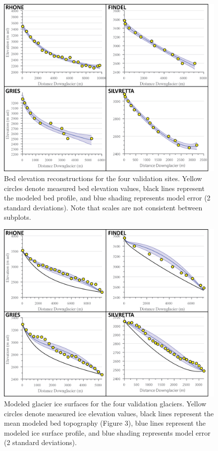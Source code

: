 \documentclass[review]{elsarticle}
\begin{document}
\begin{figure}
    \centering
    \includegraphics[width=\textwidth]{Figures/Hypsometry.png}
    \caption{Bed elevation reconstructions for the four validation sites. Yellow circles denote measured bed elevation values, black lines represent the modeled bed profile, and blue shading represents model error (2 standard deviations). Note that scales are not consistent between subplots.}
    \label{fig:hyp}
\end{figure}

\begin{figure}
    \centering
    \includegraphics[width=\textwidth]{Figures/Ice.png}
    \caption{Modeled glacier ice surfaces for the four validation glaciers. Yellow circles denote measured ice elevation values, black lines represent the mean modeled bed topography (Figure 3), blue lines represent the modeled ice surface profile, and blue shading represents model error (2 standard deviations).}
    \label{fig:ice}
\end{figure}
\end{document}
